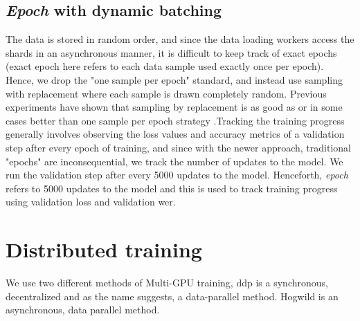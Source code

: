 \subsection{\emph{Epoch} with dynamic batching}
The data is stored in random order, and since the data loading workers access the shards in an asynchronous manner, it is difficult to keep track of exact epochs (exact epoch here refers to each data sample used exactly once per epoch). Hence, we drop the "one sample per epoch" standard, and instead use sampling with replacement where each sample is drawn completely random. Previous experiments have shown that sampling by replacement is as good as or in some cases better than one sample per epoch strategy \cite{Recht2012BeneathConsequences, Nielsen2015NeuralLearning}.Tracking the training progress generally involves observing the loss values and accuracy metrics of a validation step after every epoch of training, and since with the newer approach, traditional "epochs" are inconsequential, we track the number of updates to the model. We run the validation step after every 5000 updates to the model. Henceforth, \emph{epoch} refers to 5000 updates to the model and this is used to track training progress using validation loss and validation \acrshort{wer}.

\section{Distributed training}
\label{section:di}
We use two different methods of Multi-GPU training, \acrfull{ddp} is a synchronous, decentralized and as the name suggests, a data-parallel method. Hogwild is an asynchronous, data parallel method. 

